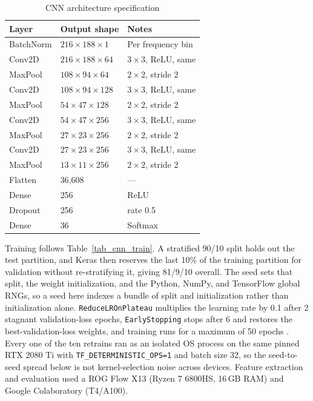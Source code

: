 \documentclass[pdflatex,sn-mathphys-num,iicol]{sn-jnl}
\begin{document}
\begin{table}[t]
\caption{CNN architecture specification}\label{tab_cnn_arch}
\begin{tabularx}{\columnwidth}{@{}lXl@{}}
\toprule
Layer & Output shape & Notes \\
\midrule
BatchNorm & $216{\times}188{\times}1$ & Per frequency bin \\
Conv2D & $216{\times}188{\times}64$ & $3{\times}3$, ReLU, same \\
MaxPool & $108{\times}94{\times}64$ & $2{\times}2$, stride 2 \\
Conv2D & $108{\times}94{\times}128$ & $3{\times}3$, ReLU, same \\
MaxPool & $54{\times}47{\times}128$ & $2{\times}2$, stride 2 \\
Conv2D & $54{\times}47{\times}256$ & $3{\times}3$, ReLU, same \\
MaxPool & $27{\times}23{\times}256$ & $2{\times}2$, stride 2 \\
Conv2D & $27{\times}23{\times}256$ & $3{\times}3$, ReLU, same \\
MaxPool & $13{\times}11{\times}256$ & $2{\times}2$, stride 2 \\
Flatten & 36{,}608 & --- \\
Dense & 256 & ReLU \\
Dropout & 256 & rate 0.5 \\
Dense & 36 & Softmax \\
\bottomrule
\end{tabularx}
\end{table}

Training follows Table~\ref{tab_cnn_train}. A stratified 90/10 split holds out the test partition, and Keras then reserves the last 10\% of the training partition for validation without re-stratifying it, giving 81/9/10 overall. The seed sets that split, the weight initialization, and the Python, NumPy, and TensorFlow global RNGs, so a seed here indexes a bundle of split and initialization rather than initialization alone. \texttt{ReduceLROnPlateau} multiplies the learning rate by 0.1 after 2 stagnant validation-loss epochs, \texttt{EarlyStopping} stops after 6 and restores the best-validation-loss weights, and training runs for a maximum of 50 epochs \cite{Wolf-Monheim2025}. Every one of the ten retrains ran as an isolated OS process on the same pinned RTX 2080 Ti with \texttt{TF\_DETERMINISTIC\_OPS=1} and batch size 32, so the seed-to-seed spread below is not kernel-selection noise across devices. Feature extraction and evaluation used a ROG Flow X13 (Ryzen 7 6800HS, 16\,GB RAM) and Google Colaboratory (T4/A100).
\end{document}
